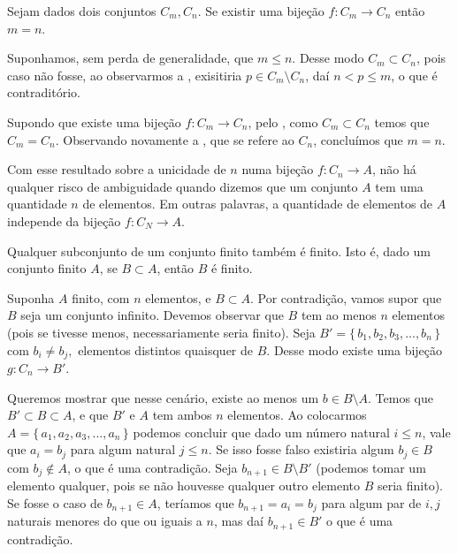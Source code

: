 \documentclass[../main.tex]{subfiles}
\begin{document}
\begin{teo}
    Sejam dados dois conjuntos $C_m, C_n$. Se existir uma bijeção $f \colon C_m \to C_n$ então $m=n$.
\end{teo}
\begin{dem}
    Suponhamos, sem perda de generalidade, que $m \leq n$. Desse modo $C_m \subset C_n$, pois caso não fosse, ao observarmos a , exisitiria $p \in C_m \setminus C_n$, daí $n < p \leq m$, o que é contraditório.

    Supondo que existe uma bijeção $f \colon C_m \to C_n$, pelo , como $C_m \subset C_n$ temos que $C_m = C_n$. Observando novamente a , que se refere ao $C_n$, concluímos que $m=n$.
\end{dem}

Com esse resultado sobre a unicidade de $n$ numa bijeção $f: C_n \to A$, não há qualquer risco de ambiguidade quando dizemos que um conjunto $A$ tem uma quantidade $n$ de elementos. Em outras palavras, a quantidade de elementos de $A$ independe da bijeção $f \colon C_N \to A$.

\begin{teo}\label{enum-teo-subconjuntoDeConjuntoFinitoFinito}
    Qualquer subconjunto de um conjunto finito também é finito. Isto é, dado um conjunto finito $A$, se $B \subset A$, então $B$ é finito. 
\end{teo}
\begin{dem}
    Suponha $A$ finito, com $n$ elementos, e $B \subset A$.
    Por contradição, vamos supor que $B$ seja um conjunto infinito.
    Devemos observar que $B$ tem ao menos $n$ elementos (pois se tivesse menos, necessariamente seria finito). 
    Seja $B' = \{\,b_1, b_2, b_3, ..., b_n\,\}$ com $b_i \neq b_j,$ elementos distintos quaisquer de $B$. Desse modo existe uma bijeção $g \colon C_n \to B'$. 
    
    Queremos mostrar que nesse cenário, existe ao menos um $b \in B \setminus A$. 
    Temos que $B' \subset B \subset A$, e que $B'$ e $A$ tem ambos $n$ elementos. Ao colocarmos $A = \{\,a_1,a_2,a_3,...,a_n\,\}$ podemos concluir que dado um número natural $i \leq n$, vale que $a_i = b_j$ para algum natural $j \leq n$. Se isso fosse falso existiria algum $b_j \in B$ com $b_j \not\in A$, o que é uma contradição. Seja $b_{n+1} \in B \setminus B'$ (podemos tomar um elemento qualquer, pois se não houvesse qualquer outro elemento $B$ seria finito). Se fosse o caso de $b_{n+1} \in A$, teríamos que $b_{n+1} = a_i = b_j$ para algum par de $i,j$ naturais menores do que ou iguais a $n$, mas daí $b_{n+1} \in B'$ o que é uma contradição.    
\end{dem}
\end{document}
